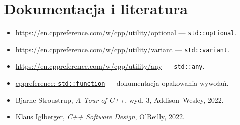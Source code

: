 \section*{Dokumentacja i literatura}
\begin{itemize}
\item \url{https://en.cppreference.com/w/cpp/utility/optional} --- \texttt{std::optional}.
\item \url{https://en.cppreference.com/w/cpp/utility/variant} --- \texttt{std::variant}.
\item \url{https://en.cppreference.com/w/cpp/utility/any} --- \texttt{std::any}.
\item \href{https://en.cppreference.com/w/cpp/utility/functional/function}{cppreference: \texttt{std::function}} --- dokumentacja opakowania wywołań.
\item Bjarne Stroustrup, \emph{A Tour of C++}, wyd. 3, Addison--Wesley, 2022.
\item Klaus Iglberger, \emph{C++ Software Design}, O'Reilly, 2022.
\end{itemize}
